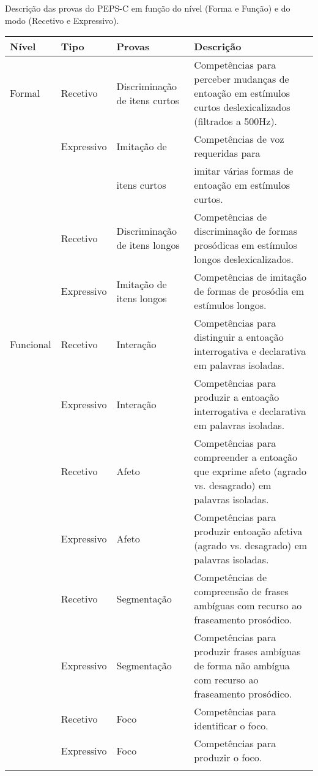 \documentclass[output=paper,colorlinks,citecolor=brown,booklanguage=portuguese]{langscibook}
\begin{document}
\begin{Tabela}
\caption{Descrição das provas do PEPS-C em função do nível (Forma e Função) e do modo (Recetivo e Expressivo).}
\label{tab:cap8tab1}

\small
\begin{tabularx}{\textwidth}{llp{2cm} Q}
\lsptoprule
 \textbf{Nível}& \textbf{Tipo} &\textbf{Provas}& \textbf{Descrição}  \\
 \midrule
 Formal & Recetivo &Discriminação de itens curtos    & Competências para perceber mudanças de entoação em estímulos curtos {deslexicalizados} (filtrados a 500Hz). \\
 \tablevspace
 & Expressivo & Imitação de & Competências de voz requeridas para \\
  & & itens curtos & imitar várias formas de entoação em {estímulos} curtos. \\
 \tablevspace
 & Recetivo & Discriminação de itens longos & Competências de discriminação de {formas} prosódicas em estímulos longos deslexicalizados. \\
 \tablevspace
 & Expressivo & Imitação de itens longos &	Competências de imitação de formas de prosódia em estímulos longos.\\
 \midrule
 Funcional & Recetivo	&Interação	&Competências para distinguir a entoação interrogativa e declarativa em palavras isoladas. \\
 \tablevspace
 &Expressivo&	Interação&	Competências para produzir a entoação interrogativa e declarativa em palavras isoladas.\\
\tablevspace
&Recetivo&	Afeto&	Competências para compreender a {entoação} que exprime afeto (agrado vs. desagrado) em palavras isoladas.\\
\tablevspace
 & Expressivo & Afeto & Competências para produzir entoação afetiva (agrado vs. desagrado) em palavras isoladas.\\
\tablevspace
& Recetivo&	Segmentação	&Competências de compreensão de frases ambíguas com recurso ao fraseamento prosódico. \\
\tablevspace
& Expressivo&	Segmentação&	Competências para produzir frases {ambíguas} de forma não ambígua com recurso ao fraseamento prosódico.\\
\tablevspace
& Recetivo &	Foco&	Competências para identificar o foco. \\
\tablevspace
& Expressivo&	Foco&	Competências para produzir o foco.\\
\lspbottomrule
\end{tabularx}
\end{Tabela}
\end{document}
